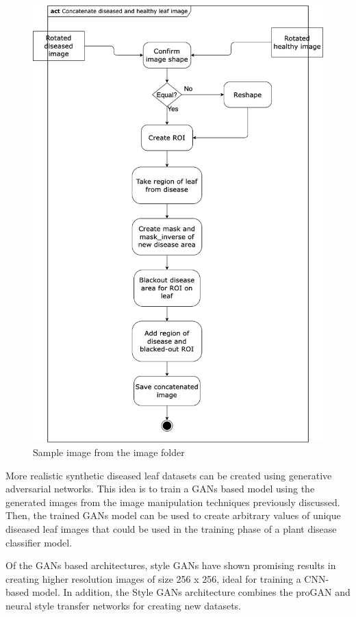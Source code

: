 \begin{figure}[!htb]
    \centering
    \includegraphics[scale=0.55, keepaspectratio]{Figures/act4.1.png}
    \caption{Sample image from the image folder}
    \label{fig:my_act4}
\end{figure} 
More realistic synthetic diseased leaf datasets can be created using generative adversarial networks. This idea is to train a GANs based model using the generated images from the image manipulation techniques previously discussed. Then, the trained GANs model can be used to create arbitrary values of unique diseased leaf images that could be used in the training phase of a plant disease classifier model. 

Of the GANs based architectures, style GANs have shown promising results in creating higher resolution images of size 256 x 256, ideal for training a CNN-based model. In addition, the Style GANs architecture combines the proGAN and neural style transfer networks for creating new datasets.




